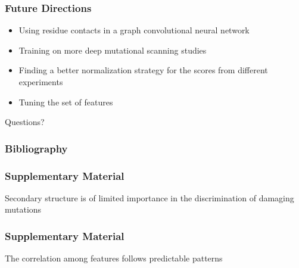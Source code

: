\documentclass[10pt, british, luatex]{beamer}
\begin{document}
\begin{frame}
	\frametitle{Future Directions}
	\begin{itemize}
		\item Using residue contacts in a graph convolutional neural network
		\item Training on more deep mutational scanning studies
		\item Finding a better normalization strategy for the scores from different experiments
		\item Tuning the set of features
	\end{itemize}
	\pause%
	\vfill%
	\Huge\centering Questions?
\end{frame}

\appendix%
\begin{frame}[allowframebreaks]
	\frametitle{Bibliography}
	\printbibliography{}%
\end{frame}

\begin{frame}
	\frametitle{Supplementary Material}
	Secondary structure is of limited importance in the discrimination of damaging mutations
	\vfill%
	\centering%
	{%
		\let\bfseries\sbseries%
		
	}
\end{frame}

\begin{frame}
	\frametitle{Supplementary Material}
	The correlation among features follows predictable patterns
	\vfill%
	\centering%
	{%
		\let\bfseries\sbseries%
		
	}
\end{frame}
\end{document}
